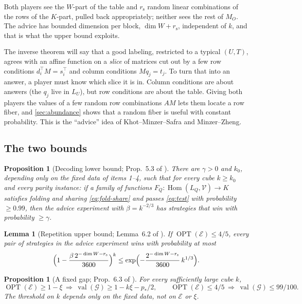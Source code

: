 \documentclass[11pt]{article}
\newtheorem{lemma}[theorem]{Lemma}
\newtheorem{proposition}[theorem]{Proposition}
\theoremstyle{definition}
\theoremstyle{remark}
\newcommand{\V}{\mathcal V}
\newcommand{\cE}{\mathcal E}
\newcommand{\cG}{\mathcal G}
\newcommand{\rs}{r_{\mathrm s}}
\DeclareMathOperator{\OPT}{OPT}
\DeclareMathOperator{\val}{val}
\DeclareMathOperator{\Hom}{Hom}
\begin{document}
Both players see the $W$-part of the table and $\rs$ random linear combinations
of the rows of the $K$-part, pulled back appropriately; neither sees the rest of
$M_O$. The advice has bounded dimension per block, $\dim W+\rs$, independent of
$k$, and that is what the upper bound exploits.

\begin{idea}
The inverse theorem will say that a good labeling, restricted to a typical
$(U,T)$, agrees with an affine function on a \emph{slice} of matrices cut out by
a few row conditions $d_i^\top M=s_i^\top$ and column conditions $Mq_j=t_j$. To
turn that into an answer, a player must know which slice it is in. Column
conditions are about answers (the $q_j$ live in $L_U$), but row conditions are
about the table. Giving both players the values of a few random row
combinations $AM$ lets them locate a row fiber, and \cref{sec:abundance} shows
that a random fiber is useful with constant probability. This is the
``advice'' idea of Khot--Minzer--Safra and Minzer--Zheng.
\end{idea}

\subsection{The two bounds}

\begin{proposition}[Decoding lower bound; Prop.~5.3 of \cite{OpenAI-UGC}]\label{prop:decode}
There are $\gamma>0$ and $k_0$, depending only on the fixed data of items
1--4, such that for every cube $k\ge k_0$ and every parity instance: if a family
of functions $F_Q\colon\Hom(L_Q,\V)\to K$ satisfies folding and sharing
\eqref{eq:fold-share} and passes \eqref{eq:test} with probability $\ge0.99$,
then the advice experiment with $\beta=k^{-2/3}$ has strategies that win with
probability $\ge\gamma$.
\end{proposition}

\begin{lemma}[Repetition upper bound; Lemma~6.2 of \cite{OpenAI-UGC}]\label{lem:clean}
If $\OPT(\cE)\le4/5$, every pair of strategies in the advice experiment wins
with probability at most
\[
\Bigl(1-\frac{\beta\,2^{-\dim W-\rs}}{3600}\Bigr)^k
\le\exp\Bigl(-\frac{2^{-\dim W-\rs}}{3600}\,k^{1/3}\Bigr).
\]
\end{lemma}

\begin{proposition}[A fixed gap; Prop.~6.3 of \cite{OpenAI-UGC}]\label{prop:gap}
For every sufficiently large cube $k$,
\[
\OPT(\cE)\ge1-\xi\ \Rightarrow\ \val(\cG)\ge1-k\xi-p_*/2,\qquad
\OPT(\cE)\le4/5\ \Rightarrow\ \val(\cG)\le99/100 .
\]
The threshold on $k$ depends only on the fixed data, not on $\cE$ or $\xi$.
\end{proposition}
\end{document}
